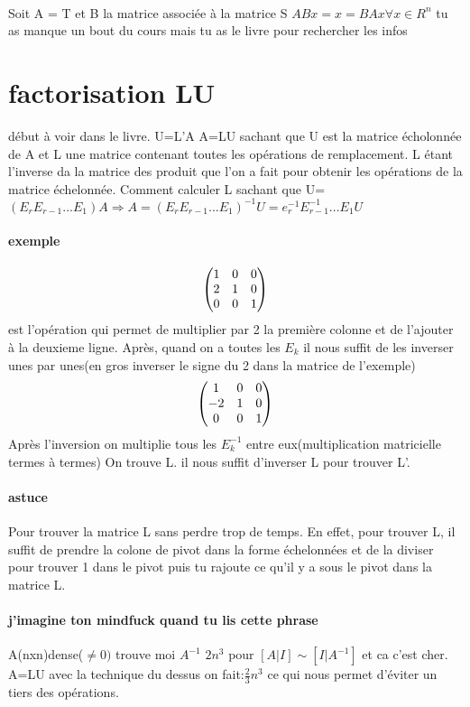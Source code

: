 \documentclass[a4paper,10pt]{article}
\begin{document}
\paragraph{}
Soit A = T et B la matrice associée à la matrice S
\newline
$ABx=x=BAx\forall x\in R^n$
tu as manque un bout du cours mais tu as le livre pour rechercher les infos

\section{factorisation LU}
début à voir dans le livre.
\newline
U=L'A
\newline
A=LU
\newline
sachant que U est la matrice écholonnée de A et L une matrice contenant toutes les opérations de remplacement. L étant l'inverse da la matrice des produit 
que l'on a fait pour obtenir les opérations de la matrice échelonnée.
\newline
Comment calculer L sachant que U=$(E_rE_{r-1}...E_1)A\Rightarrow  A=(E_rE_{r-1}...E_1)^{-1}U=e_r^{-1}E_{r-1}^{-1}...E_1U$
\paragraph{exemple}
\[
\begin{pmatrix}
1&0&0\cr
2&1&0\cr
0&0&1\cr
\end{pmatrix}
\]
\newline
est l'opération qui permet de multiplier par 2 la première colonne et de l'ajouter à la deuxieme ligne. Après, quand on a toutes les $E_k$
il nous suffit de les inverser unes par unes(en gros inverser le signe du 2 dans la matrice de l'exemple) 
\[
\begin{pmatrix}
1&0&0\cr
-2&1&0\cr
0&0&1\cr
\end{pmatrix}
\]
Après l'inversion on multiplie tous les $E_k^{-1}$ entre eux(multiplication matricielle termes à termes) On trouve L.
\newline
il nous suffit d'inverser L pour trouver L'.
\paragraph{astuce}
Pour trouver la matrice L sans perdre trop de temps. En effet, pour trouver L, il suffit de prendre la colone de pivot dans la forme échelonnées et de la 
diviser pour trouver 1 dans le pivot puis tu rajoute ce qu'il y a sous le pivot dans la matrice L.
\paragraph{j'imagine ton mindfuck quand tu lis cette phrase}
A(nxn)dense($\neq0)$ trouve moi $A^{-1}$
\newline
$2n^3$ pour $[A|I]\sim [I|A^{-1}]$ et ca c'est cher.
\newline
A=LU avec la technique du dessus on fait:$\frac{2}{3}n^3$ ce qui nous permet d'éviter un tiers des opérations.
\end{document}
